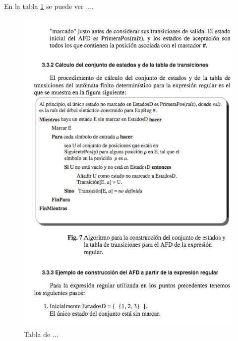 \documentclass{book}
\begin{document}
En la tabla \ref{fig:tabla3} se puede ver ....
\begin{figure}
\centering
\includegraphics[width=12cm]{img/tabla3.png}
\caption{Tabla de ...}
\label{fig:tabla3}
\end{figure}
\end{document}

